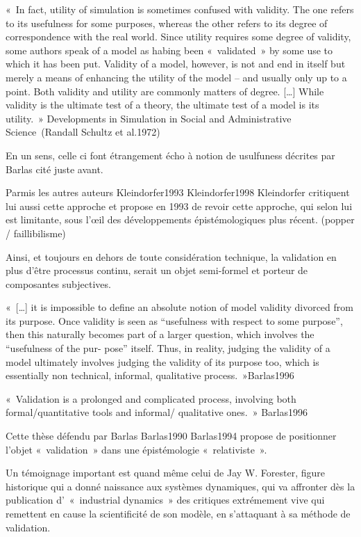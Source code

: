  « In fact, utility of simulation is sometimes confused with validity. The one refers to its usefulness for some purposes, whereas the other refers to its degree of correspondence with the real world. Since utility requires some degree of validity, some authors speak of a model as habing been « validated » by some use to which it has been put. Validity of a model, however, is not and end in itself but merely a means of enhancing the utility of the model – and usually only up to a point. Both validity and utility are commonly matters of degree. […] While validity is the ultimate test of a theory, the ultimate test of a model is its utility. » Developments in Simulation in Social and Administrative Science (Randall Schultz et al.1972)

En un sens, celle ci font étrangement écho à notion de usulfuness décrites par Barlas cité juste avant.

Parmis les autres auteurs {Kleindorfer1993} {Kleindorfer1998} Kleindorfer critiquent lui aussi cette approche et propose en 1993 de revoir cette approche, qui selon lui est limitante, sous l’œil des développements épistémologiques plus récent. (popper / faillibilisme)

Ainsi, et toujours en dehors de toute considération technique, la validation en plus d'être processus continu, serait un objet semi-formel et porteur de composantes subjectives.

« […] it is impossible to define an absolute notion of model validity divorced from its purpose. Once validity is seen as “usefulness with respect to some purpose”, then this naturally becomes part of a larger question, which involves the “usefulness of the pur- pose” itself. Thus, in reality, judging the validity of a model ultimately involves judging the validity of its purpose too, which is essentially non technical, informal, qualitative process. »{Barlas1996}

« Validation is a prolonged and complicated process, involving both formal/quantitative tools and informal/ qualitative ones. » {Barlas1996}

Cette thèse défendu par Barlas {Barlas1990} {Barlas1994} propose de positionner  l'objet « validation » dans une épistémologie « relativiste ».

Un témoignage important est quand même celui de Jay W. Forester, figure historique qui a donné naissance aux systèmes dynamiques, qui va affronter dès la publication d' « industrial dynamics » des critiques extrémement vive qui remettent en cause la scientificité de son modèle, en s'attaquant à sa méthode de validation.



